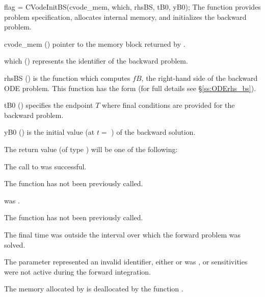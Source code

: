 {
  flag = CVodeInitBS(cvode\_mem, which, rhsBS, tB0, yB0);
}
{
  The function  provides problem specification, allocates internal memory, 
  and initializes the backward problem.
}
{
  \begin{args}
  \item[cvode\_mem] ()
    pointer to the {\cvodes} memory block returned by .
  \item[which] ()
    represents the identifier of the backward problem.
  \item[rhsBS] ()
    is the {\C} function which computes $fB$, the right-hand side of the 
    backward ODE problem. This function has the form 
    (for full details see \S\ref{ss:ODErhs_bs}).
  \item[tB0] ()
    specifies the endpoint $T$ where final conditions are provided for the 
    backward problem.
  \item[yB0] ()
    is the initial value (at $t =$ ) of the backward solution.
  \end{args}
}
{
  The return value  (of type ) will be one of the following:
  \begin{args}
  \item[\Id{CV\_SUCCESS}]
    The call to  was successful.
  \item[\Id{CV\_NO\_MALLOC}]
    The function  has not been previously called.
  \item[\Id{CV\_MEM\_NULL}]
     was .
  \item[\Id{CV\_NO\_ADJ}]
    The function  has not been previously called.
  \item[\Id{CV\_BAD\_TB0}]
    The final time  was outside the interval over which the forward problem
    was solved.
  \item[\Id{CV\_ILL\_INPUT}]
    The parameter  represented an invalid identifier, 
    either  or  was ,
    or sensitivities were not active during the forward integration.
  \end{args}
}
{
  The memory allocated by  is deallocated by the function 
  .  
}


